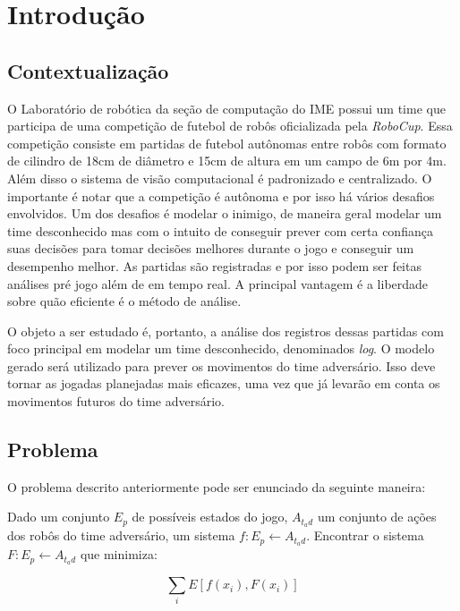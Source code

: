 \chapter{Introdução}

\section{Contextualização}

\par O Laboratório de robótica da seção de computação do IME possui um time que
participa de uma competição de futebol de robôs oficializada pela \textit{RoboCup}.
Essa competição consiste em partidas de futebol autônomas entre robôs com formato
de cilindro de 18cm de diâmetro e 15cm de altura em um campo de 6m por 4m. Além disso
o sistema de visão computacional é padronizado e centralizado. O importante é notar
que a competição é autônoma e por isso há vários desafios envolvidos.
Um dos desafios é modelar o inimigo, de maneira geral modelar um time desconhecido
mas com o intuito de conseguir prever com certa confiança suas decisões para tomar
decisões melhores durante o jogo e conseguir um desempenho melhor.
As partidas são registradas e por isso podem ser feitas análises pré jogo além
de em tempo real. A principal vantagem é a liberdade sobre quão eficiente é o método
de análise.

\par O objeto a ser estudado é, portanto, a análise dos registros dessas partidas 
com foco principal em modelar um time desconhecido, denominados \textit{log}. O modelo 
gerado será utilizado para prever os movimentos do time adversário. Isso deve tornar 
as jogadas planejadas mais  eficazes, uma vez que já levarão em conta os movimentos 
futuros do time adversário.

\section{Problema}

O problema descrito anteriormente pode ser enunciado da seguinte maneira:

Dado um conjunto $E_p$ de possíveis estados do jogo, $A_{t_ad}$ um conjunto de ações dos robôs
do time adversário, um sistema $f: {E_p} \leftarrow {A_{t_ad}}$. Encontrar o sistema 
$F: {E_p} \leftarrow {A_{t_ad}}$ que minimiza:

\begin{equation}
\sum_i E[f(x_i),F(x_i)]
\end{equation}

